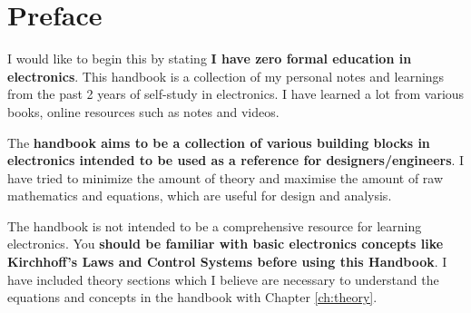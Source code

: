 \chapter*{Preface}
I would like to begin this by stating \textbf{I have zero
formal education in electronics}. This handbook is a collection
of my personal notes and learnings from the past 2 years
of self-study in electronics. I have learned a lot from
various books, online resources such as notes and videos.

The \textbf{handbook aims to be a collection of various building
blocks in electronics intended to be used as a reference
for designers/engineers}. I have tried to minimize the
amount of theory and maximise the amount of raw mathematics
and equations, which are useful for design and analysis.

The handbook is not intended to be a comprehensive resource
for learning electronics. You \textbf{should be familiar
with basic electronics concepts like Kirchhoff's Laws and
Control Systems before using this Handbook}. I have included
theory sections which I believe are necessary to understand
the equations and concepts in the handbook with Chapter
\ref{ch:theory}.


